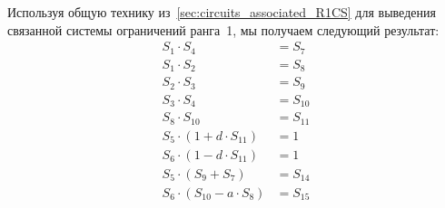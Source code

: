 Используя общую технику из~\ref{sec:circuits_associated_R1CS} для выведения связанной системы ограничений ранга~1, мы получаем следующий результат:
\begin{align*}
S_1 \cdot S_4 & = S_7 \\
S_1 \cdot S_2 & = S_8 \\
S_2 \cdot S_3 & = S_9 \\
S_3 \cdot S_4 & = S_{10} \\
S_8 \cdot S_{10} & = S_{11} \\
S_5 \cdot (1+ d\cdot S_{11}) & = 1 \\
S_6 \cdot (1 - d\cdot S_{11}) & = 1 \\
S_5 \cdot (S_9 + S_7) & = S_{14} \\
S_6 \cdot (S_{10} - a\cdot S_8) & = S_{15}
\end{align*}

